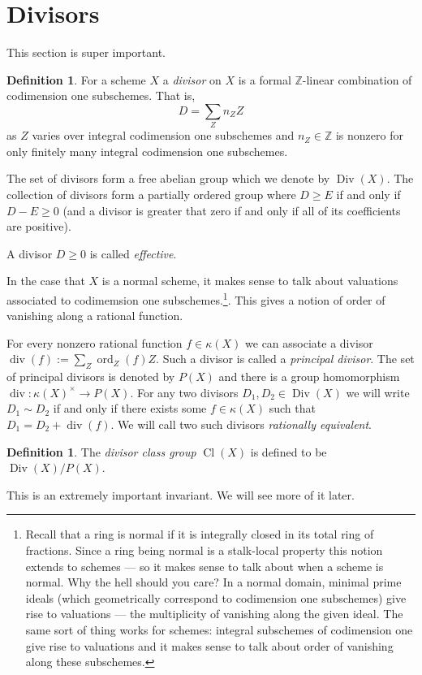 \documentclass[12pt]{article}
\numberwithin{equation}{section}
\theoremstyle{definition}
\newtheorem{definition}[theorem]{Definition}
\theoremstyle{remark}
\newcommand{\ZZ}{\mathbb{Z}}
\newcommand{\ord}{\operatorname{ord}}
\newcommand{\Div}{\operatorname{Div}}
\renewcommand{\div}{\operatorname{div}}
\newcommand{\Cl}{\operatorname{Cl}}
\begin{document}
\section{Divisors}
This section is super important.
\begin{definition}
	For a scheme $X$ a \emph{divisor} on $X$ is a formal $\ZZ$-linear combination of codimension one subschemes. That is, 
	$$ D = \sum_Z n_Z Z $$
	as $Z$ varies over integral codimension one subschemes and $n_Z \in \ZZ$ is nonzero for only finitely many integral codimension one subschemes.
\end{definition}
The set of divisors form a free abelian group which we denote by $\Div(X)$.
The collection of divisors form a partially ordered group where $D\geq E$ if and only if $D-E\geq 0$ (and a divisor is greater that zero if and only if all of its coefficients are positive).

A divisor $D\geq 0$ is called \emph{effective}.

In the case that $X$ is a normal scheme, it makes sense to talk about valuations associated to codimemsion one subschemes.\footnote{
		Recall that a ring is normal if it is integrally closed in its total ring of fractions. 
		Since a ring being normal is a stalk-local property this notion extends to schemes --- so it makes sense to talk about when a scheme is normal. 
		Why the hell should you care? In a normal domain, minimal prime ideals (which geometrically correspond to codimension one subschemes) give rise to valuations --- the multiplicity of vanishing along the given ideal. 
		The same sort of thing works for schemes: integral subschemes of codimension one give rise to valuations and it makes sense to talk about order of vanishing along these subschemes.
	}. This gives a notion of order of vanishing along a rational function.

 For every nonzero rational function $f \in \kappa(X)$ we can associate a divisor $\div(f) := \sum_{Z} \ord_Z(f) Z$. 
	Such a divisor is called a \emph{principal divisor}. 
	The set of principal divisors is denoted by $P(X)$ and there is a group homomorphism $\div: \kappa(X)^{\times} \to P(X)$.
	For any two divisors $D_1,D_2\in \Div(X)$ we will write $D_1\sim D_2$ if and only if there exists some $f\in \kappa(X)$ such that $D_1 = D_2 + \div(f)$. 
	We will call two such divisors \emph{rationally equivalent}.
\begin{definition}
The \emph{divisor class group} $\Cl(X)$ is defined to be $\Div(X)/P(X)$. 
\end{definition}
This is an extremely important invariant. We will see more of it later.
\end{document}
